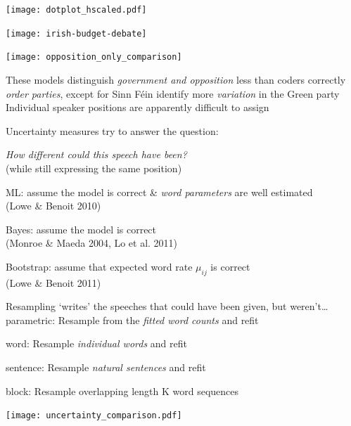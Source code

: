 \documentclass{mediumfoils}
\begin{document}

\centerline{\texttt{[image: dotplot\_hscaled.pdf]}}

\centerline{\texttt{[image: irish-budget-debate]}}

\centerline{\texttt{[image: opposition\_only\_comparison]}}


These models  
\ita
\itm distinguish \textit{government and opposition} less than coders
\itm correctly \textit{order parties}, {except} for Sinn F\'ein
\itm identify more \textit{variation} in the Green party
\itz
~\\
Individual speaker positions are apparently difficult to assign


Uncertainty measures try to answer the question:

\begin{center}
\textit{How different could this speech have been?}\\
(while still expressing the same position)
\end{center}


{ML}: assume the model is correct \& \textit{word parameters} are well estimated\\
{\textcolor{pale}{(Lowe \& Benoit 2010)}}

{Bayes}: assume the model is correct\\
{\textcolor{pale}{(Monroe \& Maeda 2004, Lo et al. 2011)}}

{Bootstrap}: assume that expected word rate $\mu_{ij}$ is correct\\
{\textcolor{pale}{(Lowe \& Benoit 2011)}}


Resampling `writes' the speeches that could have been given, but weren't\ldots
\vfill
\pause
{parametric}: Resample from the \textit{fitted word counts} and refit

{word}: Resample \textit{individual words} and refit

{sentence}: Resample \textit{natural sentences} and refit

{block}: Resample overlapping length K word sequences

\centerline{\texttt{[image: uncertainty\_comparison.pdf]}}
\end{document}
